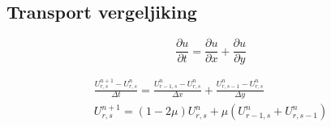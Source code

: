 \documentclass[11pt]{article} %
\begin{document}
	\subsection{Transport vergeljiking}
		\begin{equation}
			\frac{\partial u}{\partial t} = \frac{\partial u}{\partial x} + \frac{\partial u}{\partial y}
		\end{equation}
		
		\begin{eqnarray}
			\frac{U_{r,s}^{n+1} - U_{r,s}^n}{\Delta t} = 
			\frac{U^n_{r-1,s} -U^n_{r,s}}{\Delta x} +
			\frac{U^n_{r,s-1} -U^n_{r,s}}{\Delta y} \\
			U_{r,s}^{n+1} = (1- 2 \mu)U^n_{r,s} + \mu (U^n_{r-1,s}+U^n_{r,s-1})
		\end{eqnarray}
\end{document}
